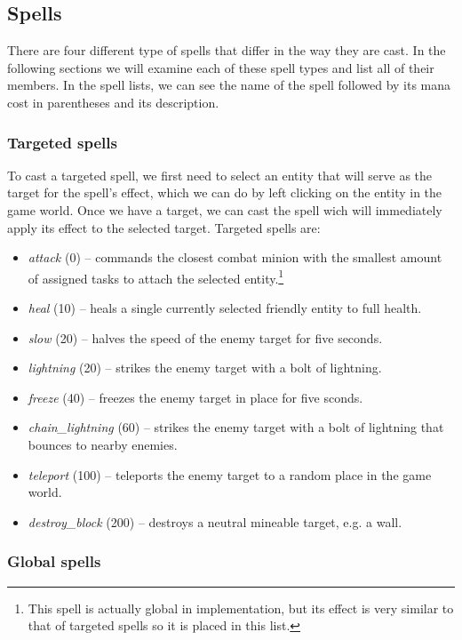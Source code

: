 \subsection{Spells}

There are four different type of spells that differ in the way they are cast. In the following sections we will examine each of these
spell types and list all of their members. In the spell lists, we can see the name of the spell followed by its mana cost in parentheses
and its description.

\subsubsection{Targeted spells}

To cast a targeted spell, we first need to select an entity that will serve as the target for the spell's effect, which we can do by left
clicking on the entity in the game world. Once we have a target, we can cast the spell wich will immediately apply its effect to the
selected target. Targeted spells are:

\begin{itemize}
    \item \emph{attack} (0) -- commands the closest combat minion with the smallest amount of assigned tasks to attach the selected
        entity.\footnote{This spell is actually global in implementation, but its effect is very similar to that of targeted spells
        so it is placed in this list.}
    \item \emph{heal} (10) -- heals a single currently selected friendly entity to full health.
    \item \emph{slow} (20) -- halves the speed of the enemy target for five seconds.
    \item \emph{lightning} (20) -- strikes the enemy target with a bolt of lightning.
    \item \emph{freeze} (40) -- freezes the enemy target in place for five sconds.
    \item \emph{chain\_lightning} (60) -- strikes the enemy target with a bolt of lightning that bounces to nearby enemies.
    \item \emph{teleport} (100) -- teleports the enemy target to a random place in the game world.
    \item \emph{destroy\_block} (200) -- destroys a neutral mineable target, e.g. a wall.
\end{itemize}

\subsubsection{Global spells}

